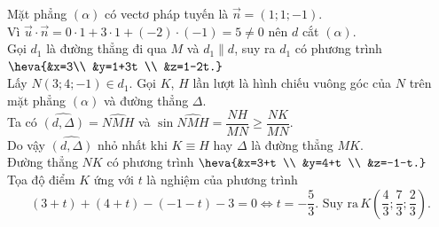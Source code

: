 \begin{ex}
{		Mặt phẳng $(\alpha)$ có vectơ  pháp tuyến là $\vec{n}=(1; 1;-1)$.\\
		Vì $\vec{u} \cdot \vec{n}=0\cdot 1+3\cdot 1+(-2) \cdot(-1)=5\neq 0$ nên $d$ cắt $(\alpha)$.\\
		Gọi $d_1$ là đường thẳng đi qua $M$ và $d_1 \parallel d$, suy ra $d_1$ có phương trình $\heva{&x=3\\
			&y=1+3t \\
			&z=1-2t.}$\\
		Lấy $N(3; 4;-1) \in d_1$. Gọi $K$, $H$ lần lượt là hình chiếu vuông góc của $N$ trên mặt phẳng $(\alpha)$ và đường thẳng $\Delta$.\\		
		Ta có $\widehat{(d, \Delta)}=\widehat{NMH}$ và $\sin \widehat{NMH}=\dfrac{NH}{MN} \geq \dfrac{NK}{MN}$.\\		
		Do vậy $\widehat{(d, \Delta)}$ nhỏ nhất khi $K\equiv H$ hay $\Delta$ là đường thẳng $MK$.\\
		Đường thẳng $NK$ có phương trình $\heva{&x=3+t \\
			&y=4+t \\
			&z=-1-t.}$\\
		Tọa độ điểm $K$ ứng với $t$ là nghiệm của phương trình
		$$(3+t)+(4+t)-(-1-t)-3=0 \Leftrightarrow t=-\dfrac{5}{3} \text {. Suy ra}\, K\left(\dfrac{4}{3}; \dfrac{7}{3}; \dfrac{2}{3}\right).	$$
	}
\end{ex}
